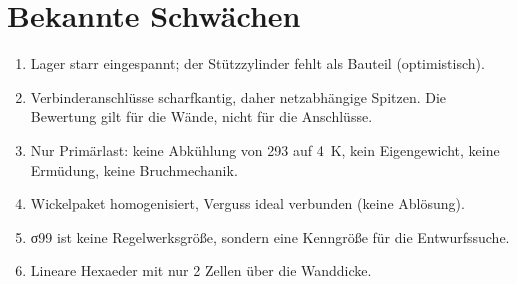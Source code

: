 \documentclass[10pt,a4paper]{article}
\begin{document}
\section{Bekannte Schwächen}
\begin{enumerate}[itemsep=1pt]
\item Lager starr eingespannt; der Stützzylinder fehlt als Bauteil (optimistisch).
\item Verbinderanschlüsse scharfkantig, daher netzabhängige Spitzen. Die Bewertung gilt für die Wände, nicht für die
Anschlüsse.
\item Nur Primärlast: keine Abkühlung von \SI{293}{} auf \SI{4}{K}, kein Eigengewicht, keine Ermüdung, keine
Bruchmechanik.
\item Wickelpaket homogenisiert, Verguss ideal verbunden (keine Ablösung).
\item σ99 ist keine Regelwerksgröße, sondern eine Kenngröße für die Entwurfssuche.
\item Lineare Hexaeder mit nur 2 Zellen über die Wanddicke.
\end{enumerate}
\end{document}
